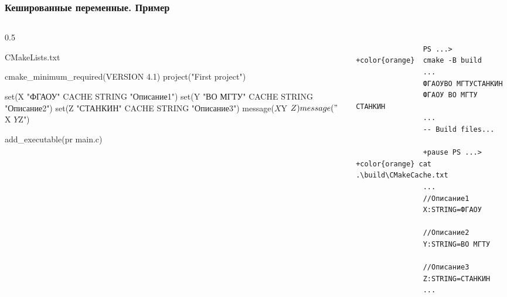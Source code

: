 \documentclass[10pt, aspectratio=1610]{beamer}
\begin{document}
\begin{frame}[fragile]\frametitle{Кешированные переменные. Пример}
	\begin{columns}[]
		\edef\colA{0.5}
		\begin{column}{\colA\linewidth}
			\begin{block}{CMakeLists.txt}
				\begin{cmakecode}
					cmake_minimum_required(VERSION 4.1)
					project("First project")
					
					set(X "ФГАОУ" CACHE STRING  "Описание1")
					set(Y "ВО МГТУ" CACHE STRING "Описание2")
					set(Z "СТАНКИН" CACHE STRING "Описание3")
					message(${X} ${Y} ${Z})
					message("${X} ${Y} ${Z}")
					
					add_executable(pr main.c)
				\end{cmakecode}
			\end{block}
			
		\end{column}
		\begin{column}{\fpeval{1-\colA}\linewidth}
			\begin{Verbatim}[bgcolor=black,tabsize=4,formatcom=\color{white},gobble=4,fontsize=\footnotesize, xleftmargin=0em, frame=single,framerule=0pt ,rulecolor=\color{red},framesep=1em,fillcolor=\color{black},commandchars=+\{\}]
				
				PS ...> +color{orange}  cmake -B build
				...
				ФГАОУВО МГТУСТАНКИН
				ФГАОУ ВО МГТУ СТАНКИН
				...
				-- Build files... 
				
				+pause PS ...> +color{orange} cat .\build\CMakeCache.txt
				...
				//Описание1
				X:STRING=ФГАОУ
				
				//Описание2
				Y:STRING=ВО МГТУ
				
				//Описание3
				Z:STRING=СТАНКИН
				...
				
			\end{Verbatim}
		\end{column}
	\end{columns}	
\end{frame}
\end{document}
